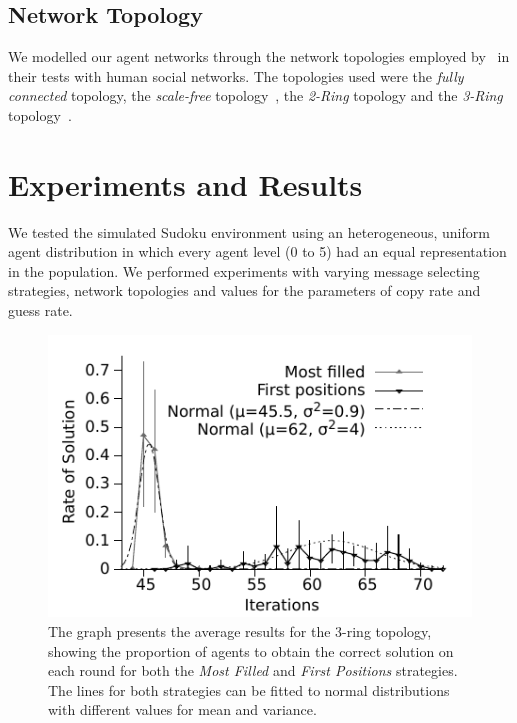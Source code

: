 \documentclass{article}
\begin{document}
\subsection{Network Topology}

We modelled our agent networks through the network topologies employed by~\cite{farenzena:collabem} in their tests with human social networks. The topologies used were the {\em fully connected} topology, the {\em scale-free} topology~\cite{barabasi:linked}, the {\em 2-Ring} topology and the {\em 3-Ring} topology~\cite{newman:newtorks}.

\section{Experiments and Results}
\label{sec:results}

We tested the simulated Sudoku environment using an heterogeneous, uniform agent distribution in which every agent level (0 to 5) %
had an equal representation in the population. We performed experiments with varying message selecting strategies, network topologies and values for the parameters of copy rate and guess rate.

\begin{figure}
\includegraphics[scale=1]{ijcai_sudoku/ring}
\caption{The graph presents the average results for the 3-ring topology, showing the proportion of agents to obtain the correct solution on each round for both the \emph{Most Filled} and \emph{First Positions} strategies. The lines for both strategies can be fitted to normal distributions with different values for mean and variance.}
\label{fig:ring_gauss}
\end{figure}
\end{document}
